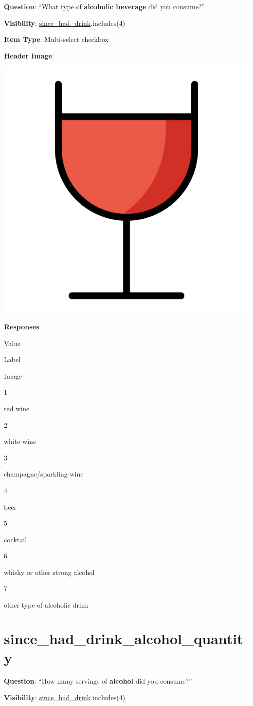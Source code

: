 \documentclass[]{book}
\begin{document}
\textbf{Question}: ``What type of \textbf{alcoholic beverage} did you consume?''

\textbf{Visibility}: \protect\hyperlink{since_had_drink}{since\_had\_drink}.includes(4)

\textbf{Item Type}: Multi-select checkbox

\textbf{Header Image}:

\begin{flushleft}\includegraphics[width=0.33\linewidth]{downloadFigs4latex_NIMH_Applet_Codebook/since_had_drink_alcohol_type_headerImg} \end{flushleft}

\textbf{Responses}:

Value

Label

Image

1

red wine

2

white wine

3

champagne/sparkling wine

4

beer

5

cocktail

6

whisky or other strong alcohol

7

other type of alcoholic drink

\hypertarget{since_had_drink_alcohol_quantity}{%
\section{since\_had\_drink\_alcohol\_quantity}\label{since_had_drink_alcohol_quantity}}

\textbf{Question}: ``How many servings of \textbf{alcohol} did you consume?''

\textbf{Visibility}: \protect\hyperlink{since_had_drink}{since\_had\_drink}.includes(4)
\end{document}
